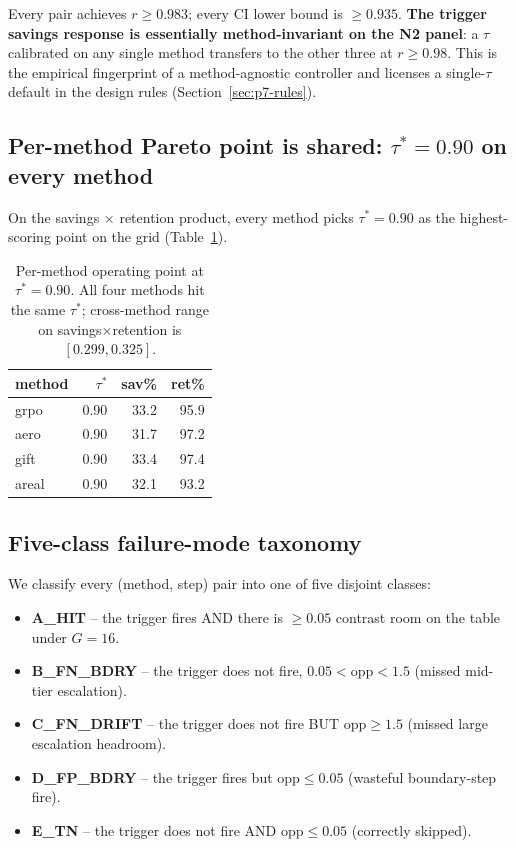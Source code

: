 \documentclass{article}
\begin{document}
Every pair achieves $r \ge 0.983$; every CI lower bound is $\ge 0.935$.
\textbf{The trigger savings response is essentially method-invariant on the
N2 panel}: a $\tau$ calibrated on any single method transfers to the other
three at $r \ge 0.98$.  This is the empirical fingerprint of a method-agnostic
controller and licenses a single-$\tau$ default in the design rules
(Section~\ref{sec:p7-rules}).

\subsection{Per-method Pareto point is shared: $\tau^*{=}0.90$ on every method}

On the savings $\times$ retention product, every method picks
$\tau^*{=}0.90$ as the highest-scoring point on the grid
(Table~\ref{tab:p7-iter107-pareto}).

\begin{table}[t]
\centering\small
\caption{Per-method operating point at $\tau^*{=}0.90$.  All four methods
hit the same $\tau^*$; cross-method range on savings$\times$retention is
$[0.299, 0.325]$.}
\label{tab:p7-iter107-pareto}
\vspace{2pt}
\begin{tabular}{lrrr}
\toprule
method & $\tau^*$ & sav\% & ret\% \\
\midrule
grpo  & 0.90 & 33.2 & 95.9 \\
aero  & 0.90 & 31.7 & 97.2 \\
gift  & 0.90 & 33.4 & 97.4 \\
areal & 0.90 & 32.1 & 93.2 \\
\bottomrule
\end{tabular}
\end{table}

\subsection{Five-class failure-mode taxonomy}

We classify every (method, step) pair into one of five disjoint classes:

\begin{itemize}
\item \textbf{A\_HIT} -- the trigger fires AND there is $\ge 0.05$ contrast
room on the table under $G{=}16$.
\item \textbf{B\_FN\_BDRY} -- the trigger does not fire, $0.05 < \mathrm{opp} < 1.5$
(missed mid-tier escalation).
\item \textbf{C\_FN\_DRIFT} -- the trigger does not fire BUT $\mathrm{opp} \ge 1.5$
(missed large escalation headroom).
\item \textbf{D\_FP\_BDRY} -- the trigger fires but $\mathrm{opp} \le 0.05$
(wasteful boundary-step fire).
\item \textbf{E\_TN} -- the trigger does not fire AND $\mathrm{opp} \le 0.05$
(correctly skipped).
\end{itemize}
\end{document}

